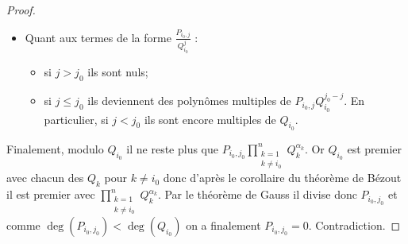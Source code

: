 \documentclass[french]{book}
\theoremstyle{plain}
\theoremstyle{definition}
\theoremstyle{remark}
\begin{document}
\begin{proof}
\begin{itemize}
		\item Quant aux termes de la forme $\displaystyle\frac{P_{i_{0},j}}{Q_{i_{0}}^{j}}$ :
		\begin{itemize}
			\item[--] si $j>j_{0}$ ils sont nuls;
			\item[--] si $j\leqslant j_{0}$ ils deviennent des polynômes multiples de $P_{i_{0},j}Q_{i_{0}}^{j_{0}-j}$. En particulier, si $j<j_{0}$ ils sont encore multiples de $Q_{i_{0}}$.
		\end{itemize}
	\end{itemize}	
	Finalement, modulo $Q_{i_{0}}$ il ne reste plus que $\displaystyle P_{i_{0},j_{0}}\prod_{\substack{k=1\\ k\ne i_0}}^{n}Q_{k}^{\alpha_{k}}$. Or $Q_{i_{0}}$ est premier avec chacun des $Q_{k}$ pour $k\ne i_{0}$ donc d'après le corollaire du théorème de Bézout il est premier avec $\displaystyle\prod_{\substack{k=1\\ k\ne i_0}}^{n}Q_{k}^{\alpha_{k}}$. Par
	le théorème de Gauss il divise donc $P_{i_{0},j_{0}}$ et comme $\deg(P_{i_0,j_0})<\deg(Q_{i_0})$ on a finalement $P_{i_{0},j_{0}}=0$. Contradiction.
\end{proof}
\end{document}
